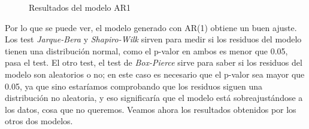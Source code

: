 \begin{figure}[H]
	\caption{Resultados del modelo AR1}
	\label{fig:11}
\end{figure}

Por lo que se puede ver, el modelo generado con AR(1) obtiene un buen ajuste. Los test \textit{Jarque-Bera} y \textit{Shapiro-Wilk} sirven para medir si los residuos del modelo tienen una distribución normal, como el p-valor en ambos es menor que 0.05, pasa el test. El otro test, el test de \textit{Box-Pierce} sirve para saber si los residuos del modelo son aleatorios o no; en este caso es necesario que el p-valor sea  mayor que 0.05, ya que sino estaríamos comprobando que los residuos siguen una distribución no aleatoria, y eso significaría que el modelo está sobreajustándose a los datos, cosa que no queremos. Veamos ahora los resultados obtenidos por los otros dos modelos.


